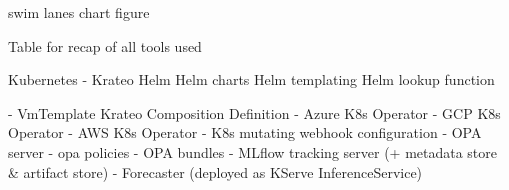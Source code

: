 swim lanes chart figure







Table for recap of all tools used

Kubernetes
- Krateo
Helm
    Helm charts
    Helm templating
    Helm lookup function

- VmTemplate Krateo Composition Definition
- Azure K8s Operator
- GCP K8s Operator
- AWS K8s Operator
- K8s mutating webhook configuration
- OPA server
- opa policies
- OPA bundles
- MLflow tracking server (+ metadata store & artifact store)
- Forecaster (deployed as KServe InferenceService)


\newpage

